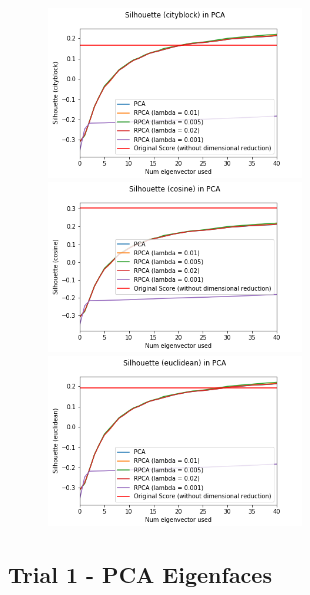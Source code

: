 \documentclass[11pt]{scrartcl} %
\theoremstyle{plain}
\begin{document}
\begin{figure}[H]
\centering
\includegraphics[width=0.6\textwidth]{figures/rpcatrial3cityblock.png}\\
\includegraphics[width=0.6\textwidth]{figures/rpcatrial3cosine.png}\\
\includegraphics[width=0.6\textwidth]{figures/rpcatrial3euclidean.png}\\
\end{figure}


\subsection{Trial 1 - PCA Eigenfaces}
\end{document}
